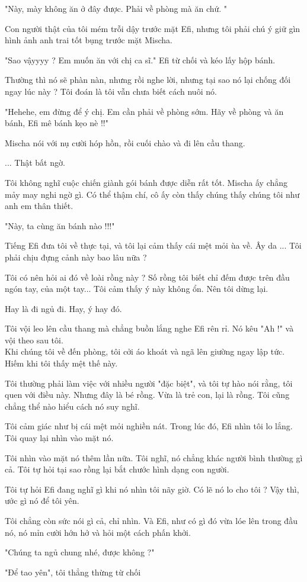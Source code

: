  "Này, mày không ăn ở đây được. Phải về phòng mà ăn chứ. "
 
 Con người thật của tôi mém trỗi dậy trước mặt Efi, nhưng tôi phải chú ý giữ gìn hình ảnh anh trai tốt bụng trước mặt Mischa.
 
 "Sao vậyyyy ? Em muốn ăn với chị ca sĩ." Efi từ chối và kéo lấy hộp bánh.
 
 Thường thì nó sẽ phàn nàn, nhưng rồi nghe lời, nhưng tại sao nó lại chống đối ngay lúc này ? Tôi đoán là tôi vẫn chưa biết cách nuôi nó.
 
 "Hehehe, em đừng để ý chị. Em cần phải về phòng sớm. Hãy về phòng và ăn bánh, Efi mê bánh kẹo nè !!"
 
 Mischa nói với nụ cười hóp hồn, rồi cuối chào và đi lên cầu thang.
 
 ... Thật bất ngờ.
 
 Tôi không nghĩ cuộc chiến giành gói bánh được diễn rất tốt. Mischa ấy chẳng mảy may nghi ngờ gì. Có thể thậm chí, cô ấy còn thấy chúng thấy chúng tôi như anh em thân thiết.
 
 "Này, ta cùng ăn bánh nào !!!"
 
 Tiếng Efi đưa tôi về thực tại, và tôi lại cảm thấy cái mệt mỏi ùa về. Ây da ... Tôi phải chịu đựng cảnh này bao lâu nữa ?
 
 Tôi có nên hỏi ai đó về loài rồng này ? Số rồng tôi biết chỉ đếm được trên đầu ngón tay, của một tay... Tôi cảm thấy ý này không ổn. Nên tôi dừng lại.
 
 Hay là đi ngủ đi. Hay, ý hay đó.
 
 Tôi vội leo lên cầu thang mà chẳng buồn lắng nghe Efi rên rỉ. Nó kêu "Ah !" và vội theo sau tôi.\\
 
 
 Khi chúng tôi về đến phòng, tôi cởi áo khoát và ngã lên giường ngay lập tức. Hiếm khi tôi thấy mệt thế này.
 
 Tôi thường phải làm việc với nhiều người "đặc biệt", và tôi tự hào nói rằng, tôi quen với điều này. Nhưng đây là bé rồng. Vừa là trẻ con, lại là rồng. Tôi cũng chẳng thể nào hiểu cách nó suy nghĩ.
 
 Tôi cảm giác như bị cái mệt mỏi nghiền nát. Trong lúc đó, Efi nhìn tôi lo lắng. Tôi quay lại nhìn vào mặt nó. 
 
 Tôi nhìn vào mặt nó thêm lần nữa. Tôi nghĩ, nó chẳng khác người bình thường gì cả. Tôi tự hỏi tại sao rồng lại bắt chước hình dạng con người.
 
 Tôi tự hỏi Efi đang nghĩ gì khi nó nhìn tôi nãy giờ. Có lẽ nó lo cho tôi ? Vậy thì, ước gì nó để tôi yên.
 
 Tôi chẳng còn sức nói gì cả, chỉ nhìn. Và Efi, như có gì đó vừa lóe lên trong đầu nó, nó mỉn cười hớn hở và hỏi một cách phấn khởi.
 
 "Chúng ta ngủ chung nhé, được không ?"
 
 "Để tao yên", tôi thẳng thừng từ chối
 
 
 
 













